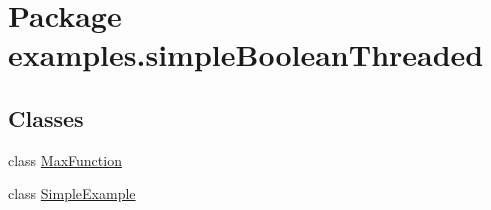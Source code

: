\hypertarget{namespaceexamples_1_1simple_boolean_threaded}{\section{Package examples.\-simple\-Boolean\-Threaded}
\label{namespaceexamples_1_1simple_boolean_threaded}
}
\subsection*{Classes}
\begin{DoxyCompactItemize}
\item 
class \hyperlink{classexamples_1_1simple_boolean_threaded_1_1_max_function}{Max\-Function}
\item 
class \hyperlink{classexamples_1_1simple_boolean_threaded_1_1_simple_example}{Simple\-Example}
\end{DoxyCompactItemize}
